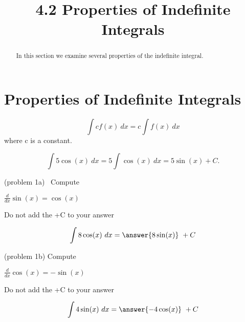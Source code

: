 \documentclass[handout]{ximera}
\title{4.2 Properties of Indefinite Integrals}
\begin{document}
\begin{abstract}
In this section we examine several properties of the indefinite integral.
\end{abstract}

\maketitle

\section{Properties of Indefinite Integrals}

\begin{theorem}
\[\int cf(x) \ dx = c\int f(x) \ dx\]
where c is a constant.
\end{theorem}


\begin{example}[example 1]
\[
\int 5\cos(x) \ dx = 5 \int \cos(x) \ dx = 5\sin(x) +C.
\]
\end{example}


\begin{problem}(problem 1a)
\ Compute

\begin{hint}
$\frac{d}{dx} \sin(x) = \cos(x)$
\end{hint}
\begin{hint}
\begin{center}
Do not add the +C to your answer
\end{center}
\end{hint}

\[
\int 8\cos(x) \ dx =
\answer{8\sin(x)} \ +  C
\]
\end{problem}



\begin{problem}(problem 1b)
Compute

\begin{hint}
$\frac{d}{dx} \cos(x) = -\sin(x)$
\end{hint}
\begin{hint}
\begin{center}
Do not add the +C to your answer
\end{center}
\end{hint}

\[
\int 4\sin(x) \ dx =
\answer{-4\cos(x)} \ +  C
\]
\end{problem}
\end{document}
